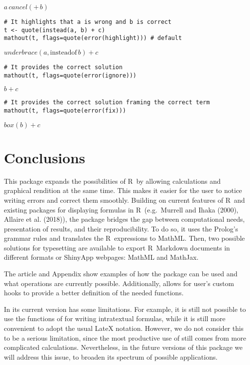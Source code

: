 \({{a}{\,{{cancel}\left({+{\,{b}}}\right)}}}\)

\begin{verbatim}
# It highlights that a is wrong and b is correct
t <- quote(instead(a, b) + c)
mathout(t, flags=quote(error(highlight))) # default
\end{verbatim}

\({{{underbrace}\left({{a}{,{\mathrm{instead of}{\,{b}}}}}\right)}+{c}}\)

\begin{verbatim}
# It provides the correct solution
mathout(t, flags=quote(error(ignore)))
\end{verbatim}

\({{b}+{c}}\)

\begin{verbatim}
# It provides the correct solution framing the correct term
mathout(t, flags=quote(error(fix)))
\end{verbatim}

\({{{box}\left({b}\right)}+{c}}\)

\hypertarget{conclusions}{%
\section{Conclusions}\label{conclusions}}

This package expands the possibilities of R~by allowing calculations and graphical rendition at the same time. This makes it easier for the user to notice writing errors and correct them smoothly. Building on current features of R~and existing packages for displaying formulas in R~(e.g.~Murrell and Ihaka (2000), Allaire et al. (2018)), the  package bridges the gap between computational needs, presentation of results, and their reproducibility. To do so, it uses the Prolog's grammar rules and translates the R~expressions to MathML. Then, two possible solutions for typesetting are available to export R~Markdown documents in different formats or ShinyApp webpages: MathML and MathJax.

The article and Appendix show examples of how the package can be used and what operations are currently possible. Additionally,  allows for user's custom hooks to provide a better definition of the needed functions.

In its current version  has some limitations. For example, it is still not possible to use the functions of  for writing intratextual formulas, while it is still more convenient to adopt the usual LateX notation. However, we do not consider this to be a serious limitation, since the most productive use of  still comes from more complicated calculations. Nevertheless, in the future versions of this package we will address this issue, to broaden its spectrum of possible applications.

